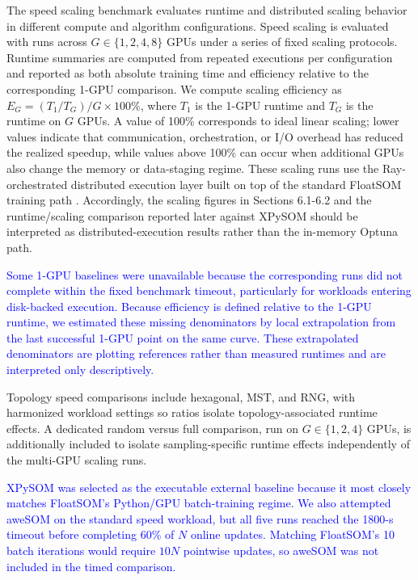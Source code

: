 \documentclass[10pt]{article} %
\newcommand{\TrackedChange}[1]{\textcolor{blue}{#1}}
\begin{document}
The speed scaling benchmark evaluates runtime and distributed scaling behavior in different compute and algorithm configurations. Speed scaling is evaluated with runs across $G\in\{1,2,4,8\}$ GPUs under a series of fixed scaling protocols. Runtime summaries are computed from repeated executions per configuration and reported as both absolute training time and efficiency relative to the corresponding 1-GPU comparison. We compute scaling efficiency as $E_G=(T_1/T_G)/G \times 100\%$, where $T_1$ is the 1-GPU runtime and $T_G$ is the runtime on $G$ GPUs. A value of 100\% corresponds to ideal linear scaling; lower values indicate that communication, orchestration, or I/O overhead has reduced the realized speedup, while values above 100\% can occur when additional GPUs also change the memory or data-staging regime. These scaling runs use the Ray-orchestrated distributed execution layer built on top of the standard FloatSOM training path \citep{moritzRayDistributedFramework2018}. Accordingly, the scaling figures in Sections 6.1-6.2 and the runtime/scaling comparison reported later against XPySOM should be interpreted as distributed-execution results rather than the in-memory Optuna path.

\TrackedChange{Some 1-GPU baselines were unavailable because the corresponding runs did not complete within the fixed benchmark timeout, particularly for workloads entering disk-backed execution.} \TrackedChange{Because efficiency is defined relative to the 1-GPU runtime, we estimated these missing denominators by local extrapolation from the last successful 1-GPU point on the same curve.} \TrackedChange{These extrapolated denominators are plotting references rather than measured runtimes and are interpreted only descriptively.}

Topology speed comparisons include hexagonal, MST, and RNG, with harmonized workload settings so ratios isolate topology-associated runtime effects. A dedicated random versus full comparison, run on $G\in\{1,2,4\}$ GPUs, is additionally included to isolate sampling-specific runtime effects independently of the multi-GPU scaling runs.

\TrackedChange{XPySOM was selected as the executable external baseline because it most closely matches FloatSOM's Python/GPU batch-training regime.} \TrackedChange{We also attempted aweSOM on the standard speed workload, but all five runs reached the 1800-s timeout before completing 60\% of $N$ online updates.} \TrackedChange{Matching FloatSOM's 10 batch iterations would require $10N$ pointwise updates, so aweSOM was not included in the timed comparison.}
\end{document}
